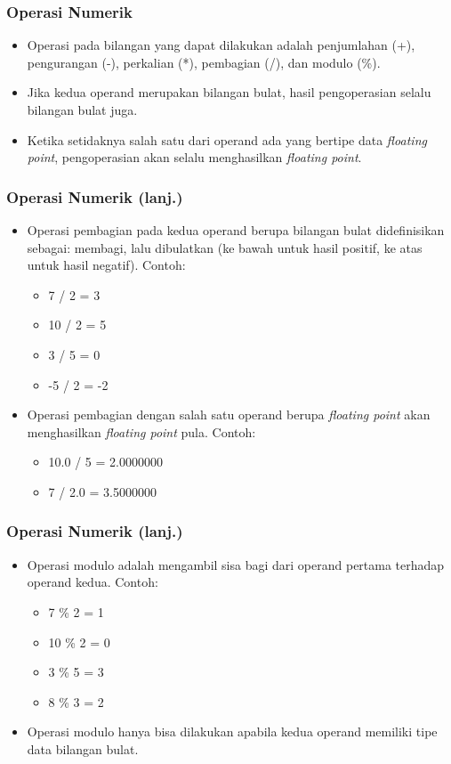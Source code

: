 \begin{frame}
\frametitle{Operasi Numerik}
\begin{itemize}
  \item Operasi pada bilangan yang dapat dilakukan adalah penjumlahan (+), pengurangan (-), perkalian (*), pembagian (/), dan modulo (\%).
  \item Jika kedua operand merupakan bilangan bulat, hasil pengoperasian selalu bilangan bulat juga.
  \item Ketika setidaknya salah satu dari operand ada yang bertipe data \textit{floating point}, pengoperasian akan selalu menghasilkan \textit{floating point}.
\end{itemize}
\end{frame}

\begin{frame}
\frametitle{Operasi Numerik (lanj.)}
\begin{itemize}
  \item Operasi pembagian pada kedua operand berupa bilangan bulat didefinisikan sebagai: membagi, lalu dibulatkan (ke bawah untuk hasil positif, ke atas untuk hasil negatif). Contoh:
  \begin{itemize}
    \item 7 / 2 = 3
    \item 10 / 2 = 5
    \item 3 / 5 = 0
    \item -5 / 2 = -2
  \end{itemize}
  \item Operasi pembagian dengan salah satu operand berupa \textit{floating point} akan menghasilkan \textit{floating point} pula. Contoh:
    \begin{itemize}
      \item 10.0 / 5 = 2.0000000
      \item 7 / 2.0 = 3.5000000
    \end{itemize}
\end{itemize}
\end{frame}

\begin{frame}
\frametitle{Operasi Numerik (lanj.)}
\begin{itemize}
  \item Operasi modulo adalah mengambil sisa bagi dari operand pertama terhadap operand kedua. Contoh:
  \begin{itemize}
    \item 7 \% 2 = 1
    \item 10 \% 2 = 0
    \item 3 \% 5 = 3
    \item 8 \% 3 = 2
  \end{itemize}
  \item Operasi modulo hanya bisa dilakukan apabila kedua operand memiliki tipe data \alert{bilangan bulat}.
\end{itemize}
\end{frame}



